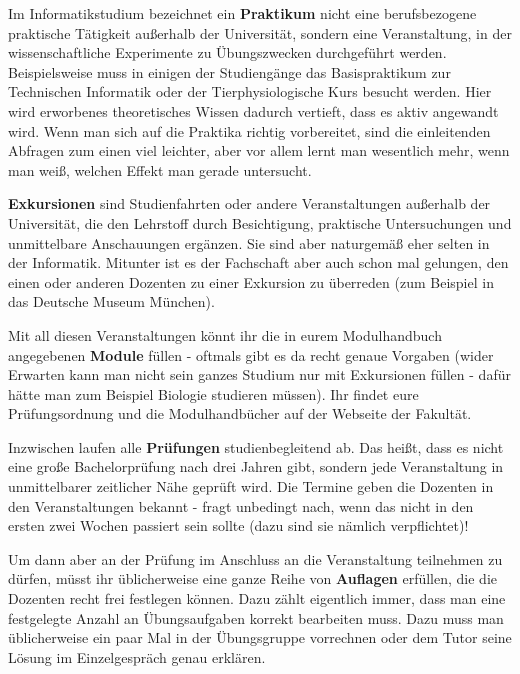 \enlargethispage{10pt}
Im Informatikstudium bezeichnet ein \textbf{Praktikum} nicht eine
  berufsbezogene praktische Tätigkeit außerhalb der Universität,
  sondern eine Veranstaltung, in der wissenschaftliche Experimente zu
  Übungszwecken durchgeführt werden.  Beispielsweise muss in einigen der 
  Studiengänge das Basispraktikum zur Technischen Informatik oder der 
  Tierphysiologische Kurs besucht werden.  Hier wird erworbenes theoretisches 
  Wissen dadurch vertieft, dass es aktiv angewandt wird. Wenn man sich auf die 
  Praktika richtig vorbereitet, sind die einleitenden Abfragen zum einen viel 
  leichter, aber vor allem lernt man wesentlich mehr, wenn man weiß, welchen 
  Effekt man gerade untersucht.

\textbf{Exkursionen} sind Studienfahrten oder andere Veranstaltungen
  außerhalb der Universität, die den Lehrstoff durch Besichtigung,
  praktische Untersuchungen und unmittelbare Anschauungen ergänzen.
  Sie sind aber naturgemäß eher selten in der Informatik. Mitunter ist es
  der Fachschaft aber auch schon mal gelungen, den einen oder anderen Dozenten 
  zu einer Exkursion zu überreden (zum Beispiel in das Deutsche Museum 
  München).

\bigskip


Mit all diesen Veranstaltungen könnt ihr die in eurem Modulhandbuch angegebenen 
\textbf{Module} füllen - oftmals gibt es da recht genaue Vorgaben (wider 
Erwarten kann man nicht sein ganzes Studium nur mit Exkursionen füllen - dafür 
hätte man zum Beispiel Biologie studieren müssen). Ihr findet eure 
Prüfungsordnung und die Modulhandbücher auf der Webseite der Fakultät.

Inzwischen laufen alle \textbf{Prüfungen} studienbegleitend ab. Das heißt, dass 
es nicht eine große Bachelorprüfung nach drei Jahren gibt, sondern jede 
Veranstaltung in unmittelbarer zeitlicher Nähe geprüft wird. Die Termine geben 
die Dozenten in den Veranstaltungen bekannt - fragt unbedingt nach, wenn das 
nicht in den ersten zwei Wochen passiert sein sollte (dazu sind sie nämlich 
verpflichtet)!

Um dann aber an der Prüfung im Anschluss an die Veranstaltung teilnehmen zu 
dürfen, müsst ihr üblicherweise eine ganze Reihe von \textbf{Auflagen} 
erfüllen, die die Dozenten recht frei festlegen können. Dazu zählt eigentlich 
immer, dass man eine festgelegte Anzahl an Übungsaufgaben korrekt bearbeiten 
muss. Dazu muss man üblicherweise ein paar Mal in der Übungsgruppe vorrechnen oder 
dem Tutor seine Lösung im Einzelgespräch genau erklären.

